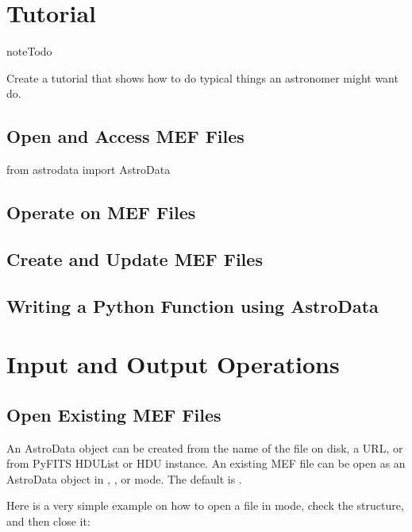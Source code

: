 \documentclass[letterpaper,10pt,english]{sphinxmanual}
\begin{document}
\chapter{Tutorial}
\label{tutorial::doc}\label{tutorial:tutorial}\label{tutorial:id1}
\begin{notice}{note}{Todo}

Create a tutorial that shows how to do typical things an astronomer might want do.
\end{notice}


\section{Open and Access MEF Files}
\label{tutorial:open-and-access-mef-files}
from astrodata import AstroData


\section{Operate on MEF Files}
\label{tutorial:operate-on-mef-files}

\section{Create and Update MEF Files}
\label{tutorial:create-and-update-mef-files}

\section{Writing a Python Function using AstroData}
\label{tutorial:writing-a-python-function-using-astrodata}

\chapter{Input and Output Operations}
\label{io:input-and-output-operations}\label{io::doc}\label{io:io}

\section{Open Existing MEF Files}
\label{io:open-existing-mef-files}
An AstroData object can be created from the name of the file on disk, a URL,
or from PyFITS HDUList or HDU instance.  An existing MEF file can be open as
an AstroData object in , , or  mode.
The default is .

Here is a very simple example on how to open a file in  mode,
check the structure, and then close it:
\end{document}
